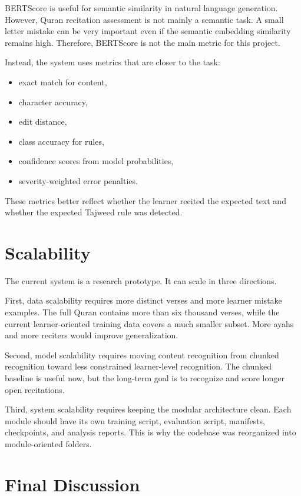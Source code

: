 \documentclass[12pt,a4paper]{report}
\begin{document}
BERTScore is useful for semantic similarity in natural language generation.
However, Quran recitation assessment is not mainly a semantic task. A small
letter mistake can be very important even if the semantic embedding similarity
remains high. Therefore, BERTScore is not the main metric for this project.

Instead, the system uses metrics that are closer to the task:

\begin{itemize}[leftmargin=*]
    \item exact match for content,
    \item character accuracy,
    \item edit distance,
    \item class accuracy for rules,
    \item confidence scores from model probabilities,
    \item severity-weighted error penalties.
\end{itemize}

These metrics better reflect whether the learner recited the expected text and
whether the expected Tajweed rule was detected.

\section{Scalability}

The current system is a research prototype. It can scale in three directions.

First, data scalability requires more distinct verses and more learner mistake
examples. The full Quran contains more than six thousand verses, while the
current learner-oriented training data covers a much smaller subset. More ayahs
and more reciters would improve generalization.

Second, model scalability requires moving content recognition from chunked
recognition toward less constrained learner-level recognition. The chunked
baseline is useful now, but the long-term goal is to recognize and score longer
open recitations.

Third, system scalability requires keeping the modular architecture clean. Each
module should have its own training script, evaluation script, manifests,
checkpoints, and analysis reports. This is why the codebase was reorganized into
module-oriented folders.

\section{Final Discussion}
\end{document}
